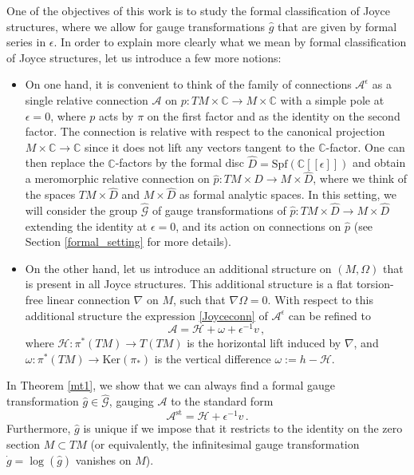 \documentclass{article}
\theoremstyle{definition}
\numberwithin{equation}{section}
\begin{document}
One of the objectives of this work is to study the formal classification of Joyce structures, where we allow for gauge transformations $\hat{g}$ that are given by formal series in $\epsilon$. In order to explain more clearly what we mean by formal classification of Joyce structures, let us introduce a few more notions: 
\begin{itemize}
\item On one hand, it is convenient to think of the family of connections $\mathcal{A}^{\epsilon}$ as a single relative connection $\mathcal{A}$ on $p:TM\times \mathbb{C}\to M\times \mathbb{C}$ with a simple pole at $\epsilon=0$, where $p$ acts by $\pi$ on the first factor and as the identity on the second factor. The connection is relative with respect to the canonical projection $M\times \mathbb{C}\to \mathbb{C}$ since it does not lift any vectors tangent to the $\mathbb{C}$-factor. One can then replace the $\mathbb{C}$-factors by the formal disc $\widehat{D}=\text{Spf}(\mathbb{C}[[\epsilon]])$ and obtain a meromorphic relative connection on $\widehat{p}: TM\times \widehat{D}\to M\times \widehat{D}$, where we think of the spaces $TM\times \widehat{D}$ and $M\times \widehat{D}$ as formal analytic spaces. In this setting, we will consider the group $\widehat{\mathcal{G}}$ of gauge transformations of $\widehat{p}: TM\times \widehat{D}\to M\times \widehat{D}$ extending the identity at $\epsilon=0$, and its action on connections on $\widehat{p}$ (see Section \ref{formal_setting} for more details). 

\item On the other hand, let us introduce an additional structure on $(M,\Omega)$ that is present in all Joyce structures. This additional structure is a flat torsion-free linear connection $\nabla$ on $M$, such that $\nabla \Omega =0$. With respect to this additional structure the expression \eqref{Joyceconn} of $\mathcal{A}^{\epsilon}$ can be refined to 
\begin{equation*}
    \mathcal{A}=\mathcal{H}+\omega+\epsilon^{-1}v\,,
\end{equation*}
where $\mathcal{H}:\pi^*(TM)\to T(TM)$ is the horizontal lift induced by $\nabla$, and $\omega:\pi^*(TM)\to \text{Ker}(\pi_*)$ is the vertical difference $\omega:=h-\mathcal{H}$. \\
\end{itemize}

In Theorem \ref{mt1}, we show that we can always find a formal gauge transformation $\hat{g}\in \widehat{\mathcal{G}}$, gauging $\mathcal{A}$ to the standard form
\begin{equation*}
    \mathcal{A}^{\text{st}}=\mathcal{H}+\epsilon^{-1}v\,.
\end{equation*}
Furthermore, $\hat{g}$ is unique if we impose that it restricts to the identity on the zero section $M\subset TM$ (or equivalently, the infinitesimal gauge transformation $\dot{g}=\log(\hat{g})$ vanishes on $M$). \\
\end{document}
